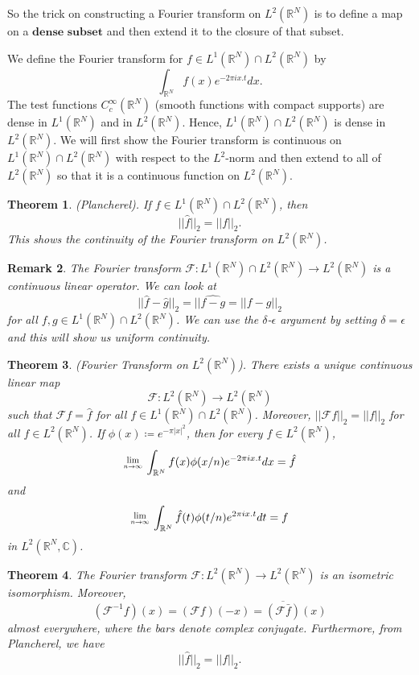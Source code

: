 \documentclass[twoside]{article}
\newcounter{lecnum}
\newcommand{\Lim}[1]{\raisebox{0.5ex}{\scalebox{0.8}{$\displaystyle \lim_{#1}\;$}}}
\newtheorem{theorem}{Theorem}[lecnum]
\newtheorem{remark}[theorem]{Remark}
\begin{document}
So the trick on constructing a Fourier transform on $L^2(\mathbb{R}^N)$ is to define a map on a $\textbf{dense subset}$ and then extend it to the closure of that subset.

We define the Fourier transform for $f \in L^1(\mathbb{R}^N) \cap L^2(\mathbb{R}^N)$ by
$$
\int_{\mathbb{R}^N}f(x)e^{-2\pi ix.t}dx.
$$
The test functions $C_c^{\infty}(\mathbb{R}^N)$ (smooth functions with compact supports) are dense in $L^1(\mathbb{R}^N)$ and in $L^2(\mathbb{R}^N)$. Hence, $L^1(\mathbb{R}^N) \cap L^2(\mathbb{R}^N)$ is dense in $L^2(\mathbb{R}^N)$. We will first show the Fourier transform is continuous on $L^1(\mathbb{R}^N) \cap L^2(\mathbb{R}^N)$ with respect to the $L^2$-norm and then extend to all of $L^2(\mathbb{R}^N)$ so that it is a continuous function on $L^2(\mathbb{R}^N)$.

\begin{theorem}(Plancherel). If $f \in L^1(\mathbb{R}^N) \cap L^2(\mathbb{R}^N)$, then
$$
||\hat{f}||_2 = ||f||_2.
$$
This shows the continuity of the Fourier transform on $L^2(\mathbb{R}^N)$.
\end{theorem}

\begin{remark} The Fourier transform $\mathcal{F}: L^1(\mathbb{R}^N) \cap L^2(\mathbb{R}^N) \rightarrow L^2(\mathbb{R}^N)$ is a continuous linear operator.  We can look at
$$
||\hat{f} - \hat{g}||_2 = ||\widehat{f - g} = ||f - g||_2
$$
for all $f, g \in L^1(\mathbb{R}^N) \cap L^2(\mathbb{R}^N)$. We can use the $\delta$-$\epsilon$ argument by setting $\delta = \epsilon$ and this will show us uniform continuity. 
\end{remark}

\begin{theorem}(Fourier Transform on $L^2(\mathbb{R}^N)$). There exists a unique continuous linear map 
$$
\mathcal{F}: L^2(\mathbb{R}^N) \rightarrow L^2(\mathbb{R}^N)
$$
such that $\mathcal{F} f = \hat{f}$ for all $f \in L^1(\mathbb{R}^N) \cap L^2(\mathbb{R}^N)$. Moreover, $||\mathcal{F}f||_2 = ||f||_2$ for all $f \in L^2(\mathbb{R}^N)$. If $\phi(x) \coloneqq e^{-\pi |x|^2}$, then for every $f \in L^2(\mathbb{R}^N)$,
$$
\Lim{n \rightarrow \infty}\int_{\mathbb{R}^N}f(x)\phi(x/n)e^{-2\pi ix.t}dx = \hat{f}
$$
and 
$$
\Lim{n \rightarrow \infty}\int_{\mathbb{R}^N}\hat{f}(t)\phi(t/n)e^{2\pi ix.t}dt = f
$$
in $L^2(\mathbb{R}^N, \mathbb{C})$.
\end{theorem}

\begin{theorem} The Fourier transform $\mathcal{F}: L^2(\mathbb{R}^N) \rightarrow L^2(\mathbb{R}^N)$ is an isometric isomorphism. Moreover, 
$$
(\mathcal{F}^{-1}f)(x) = (\mathcal{F}f)(-x) = \overline{(\mathcal{F}\bar{f})}(x)
$$
almost everywhere, where the bars denote complex conjugate. Furthermore, from Plancherel, we have
$$
||\hat{f}||_2 = ||f||_2.
$$
\end{theorem}
\end{document}
